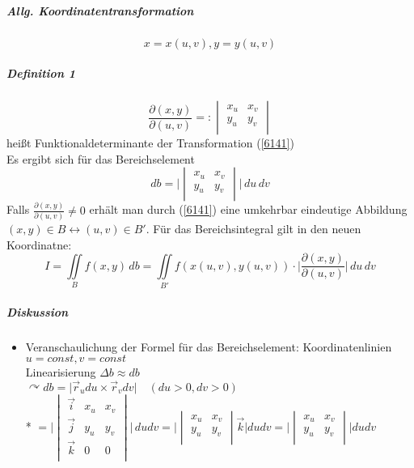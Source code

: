 \documentclass[a4paper]{scrartcl}
\begin{document}
\subparagraph{Allg. Koordinatentransformation} \begin{equation}\label{6141}x=x(u,v),y=y(u,v)\end{equation}
\subparagraph{Definition 1} \[ \frac{\partial (x,y)}{\partial (u,v)}=: \begin{vmatrix} x_u & x_v \\ y_u & y_v \\ \end{vmatrix}\] heißt Funktionaldeterminante der Transformation (\ref{6141})\\
Es ergibt sich für das Bereichselement
\[ db=\lvert \begin{vmatrix} x_u & x_v \\ y_u & y_v \\ \end{vmatrix} \rvert \, du \, dv\]
Falls $\frac{\partial (x,y)}{\partial (u,v)} \neq 0$ erhält man durch (\ref{6141}) eine umkehrbar eindeutige Abbildung $(x,y) \in B \leftrightarrow (u,v) \in B'$. Für das Bereichsintegral gilt in den neuen Koordinatne:
\[ I = \iint\limits_{B} f(x,y) \, db = \iint\limits_{B'} f(x(u,v),y(u,v)) \cdot \lvert \frac{\partial (x,y)}{\partial (u,v)} \rvert \, du \, dv \]

\subparagraph{Diskussion}
\begin{itemize}
\item Veranschaulichung der Formel für das Bereichselement:
Koordinatenlinien $u=const, v=const$\\
Linearisierung $\Delta b \approx db$\\
$\curvearrowright db= \lvert \vec{r}_u du \times \vec{r}_v dv \rvert \quad (du > 0,dv >0)$\\*
$= \lvert \begin{vmatrix} \vec{i} & x_u & x_v \\ \vec{j} & y_u & y_v \\  \vec{k} & 0 & 0\\ \end{vmatrix} \rvert \, du dv = \lvert \begin{vmatrix} x_u & x_v \\ y_u & y_v \\ \end{vmatrix}  \vec{k} \rvert du dv = \lvert \begin{vmatrix} x_u & x_v \\ y_u & y_v \\ \end{vmatrix} \rvert du dv$
\end{itemize}
\end{document}
